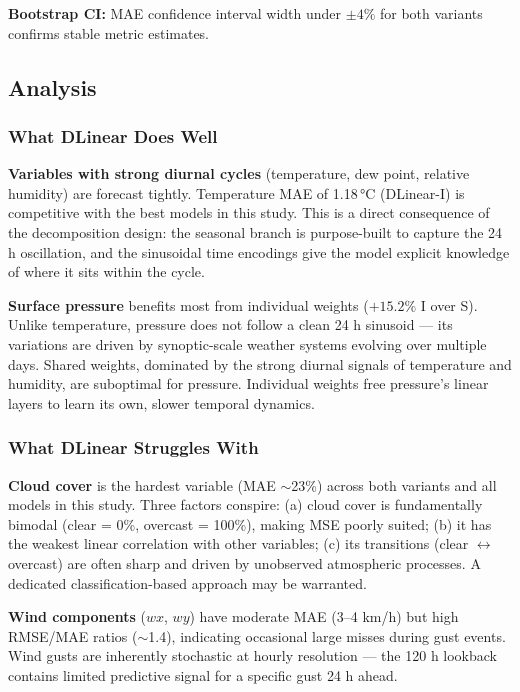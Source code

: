 \textbf{Bootstrap CI:} MAE confidence interval width under $\pm 4\%$ for both
variants confirms stable metric estimates.

\subsection{Analysis}

\subsubsection{What DLinear Does Well}

\textbf{Variables with strong diurnal cycles} (temperature, dew point, relative
humidity) are forecast tightly. Temperature MAE of 1.18\,°C (DLinear-I) is
competitive with the best models in this study. This is a direct consequence of
the decomposition design: the seasonal branch is purpose-built to capture the
24 h oscillation, and the sinusoidal time encodings give the model explicit
knowledge of where it sits within the cycle.

\textbf{Surface pressure} benefits most from individual weights ($+15.2\%$ I over
S). Unlike temperature, pressure does not follow a clean 24 h sinusoid --- its
variations are driven by synoptic-scale weather systems evolving over multiple
days. Shared weights, dominated by the strong diurnal signals of temperature and
humidity, are suboptimal for pressure. Individual weights free pressure's linear
layers to learn its own, slower temporal dynamics.

\subsubsection{What DLinear Struggles With}

\textbf{Cloud cover} is the hardest variable (MAE $\sim$23\%) across both
variants and all models in this study. Three factors conspire: (a) cloud cover is
fundamentally bimodal (clear = 0\%, overcast = 100\%), making MSE poorly suited;
(b) it has the weakest linear correlation with other variables; (c) its
transitions (clear $\leftrightarrow$ overcast) are often sharp and driven by
unobserved atmospheric processes. A dedicated classification-based approach may
be warranted.

\textbf{Wind components} ($wx$, $wy$) have moderate MAE (3--4 km/h) but high
RMSE/MAE ratios ($\sim$1.4), indicating occasional large misses during gust
events. Wind gusts are inherently stochastic at hourly resolution --- the 120 h
lookback contains limited predictive signal for a specific gust 24 h ahead.

